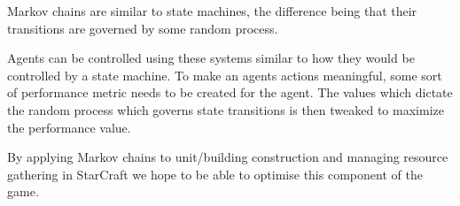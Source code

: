 Markov chains are similar to state machines, the difference being that their transitions are governed by some random process. 

Agents can be controlled using these systems similar to how they would be controlled by a state machine. To make an agents actions meaningful, some sort of performance metric needs to be created for the agent. The values which dictate the random process which governs state transitions is then tweaked to maximize the performance value.

By applying Markov chains to unit/building construction and managing resource gathering in StarCraft we hope to be able to optimise this component of the game.